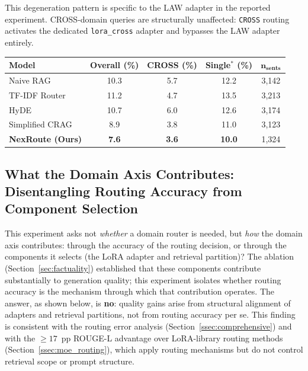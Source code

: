 \documentclass[a4paper,fleql,doubleblind]{cas-sc}
\begin{document}
This degeneration pattern is specific to the LAW adapter in the reported experiment.
CROSS-domain queries are structurally unaffected: \texttt{CROSS} routing activates
the dedicated \texttt{lora\_cross} adapter and bypasses the LAW adapter entirely.

\vspace{4pt}
\begin{center}
\begingroup
{}
\label{tab:hallucination-excl-law}
\begin{tabular}{lcccc}
\toprule
\textbf{Model} & \textbf{Overall (\%)} & \textbf{CROSS (\%)} & \textbf{Single$^{*}$ (\%)} & $\boldsymbol{n_{\text{sents}}}$ \\
\midrule
Naive RAG              & 10.3 & 5.7 & 12.2 & 3{,}142 \\
TF-IDF Router          & 11.2 & 4.7 & 13.5 & 3{,}213 \\
HyDE                   & 10.7 & 6.0 & 12.6 & 3{,}174 \\
Simplified CRAG        &  8.9 & 3.8 & 11.0 & 3{,}123 \\
\textbf{NexRoute (Ours)} & \textbf{7.6} & \textbf{3.6} & \textbf{10.0} & 1{,}324 \\
\bottomrule
\end{tabular}
\endgroup
\end{center}
\vspace{4pt}

\subsection{What the Domain Axis Contributes: Disentangling Routing Accuracy from Component Selection}
\label{ssec:domainrouter}
This experiment asks not \emph{whether} a domain router is needed, but
\emph{how} the domain axis contributes: through the accuracy of the routing
decision, or through the components it selects (the LoRA adapter and retrieval
partition)?
The ablation (Section~\ref{sec:factuality}) established that these components
contribute substantially to generation quality; this experiment isolates
whether routing accuracy is the mechanism through which that contribution
operates.
The answer, as shown below, is \textbf{no}: quality gains arise from structural
alignment of adapters and retrieval partitions, not from routing accuracy per se.
This finding is consistent with the routing error analysis (Section~\ref{ssec:comprehensive})
and with the ${\geq}17$~pp ROUGE-L advantage over LoRA-library routing methods
(Section~\ref{ssec:moe_routing}), which apply routing mechanisms but do not
control retrieval scope or prompt structure.
\end{document}
